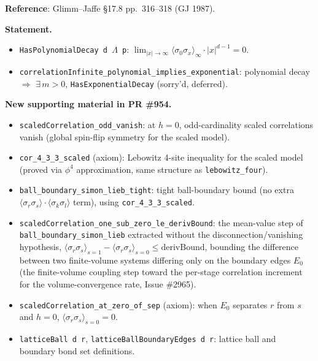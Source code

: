\documentclass[a4paper,11pt]{article}
\begin{document}
\noindent\textbf{Reference}: Glimm--Jaffe \S17.8 pp.\ 316--318 (GJ 1987).

\noindent\textbf{Statement.}
\begin{itemize}
\item \texttt{HasPolynomialDecay d $\Lambda$ p}:
  $\lim_{|x|\to\infty}\langle\sigma_0\sigma_x\rangle_\infty\cdot|x|^{d-1}=0$.
\item \texttt{correlationInfinite\_polynomial\_implies\_exponential}:
  polynomial decay $\Rightarrow$ $\exists\,m>0$, \texttt{HasExponentialDecay} (sorry'd, deferred).
\end{itemize}

\noindent\textbf{New supporting material in PR \#954.}
\begin{itemize}
\item \texttt{scaledCorrelation\_odd\_vanish}: at $h=0$, odd-cardinality scaled correlations
  vanish (global spin-flip symmetry for the scaled model).
\item \texttt{cor\_4\_3\_3\_scaled} (axiom): Lebowitz 4-site inequality for the scaled model
  (proved via $\phi^4$ approximation, same structure as \texttt{lebowitz\_four}).
\item \texttt{ball\_boundary\_simon\_lieb\_tight}: tight ball-boundary bound
  (no extra $\langle\sigma_r\sigma_s\rangle\cdot\langle\sigma_k\sigma_l\rangle$ term),
  using \texttt{cor\_4\_3\_3\_scaled}.
\item \texttt{scaledCorrelation\_one\_sub\_zero\_le\_derivBound}: the mean-value step of
  \texttt{ball\_boundary\_simon\_lieb} extracted without the disconnection/vanishing
  hypothesis, $\langle\sigma_r\sigma_s\rangle_{s=1}-\langle\sigma_r\sigma_s\rangle_{s=0}
  \le \mathrm{derivBound}$, bounding the difference between two finite-volume systems
  differing only on the boundary edges $E_0$ (the finite-volume coupling step toward
  the per-stage correlation increment for the volume-convergence rate, Issue \#2965).
\item \texttt{scaledCorrelation\_at\_zero\_of\_sep} (axiom): when $E_0$ separates $r$ from $s$
  and $h=0$, $\langle\sigma_r\sigma_s\rangle_{s=0}=0$.
\item \texttt{latticeBall d r}, \texttt{latticeBallBoundaryEdges d r}: lattice ball and
  boundary bond set definitions.
\end{itemize}
\end{document}
